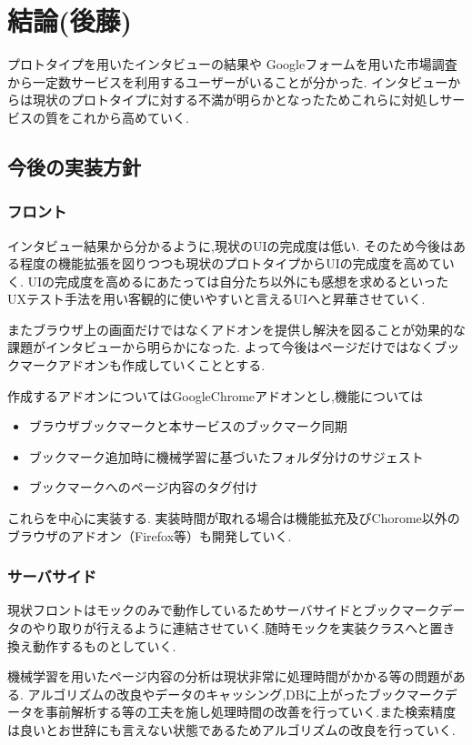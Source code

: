 \documentclass[a4paper,10pt,fleqn]{jsarticle}
\begin{document}
\section{結論(後藤)}
プロトタイプを用いたインタビューの結果や
Googleフォームを用いた市場調査から一定数サービスを利用するユーザーがいることが分かった.
インタビューからは現状のプロトタイプに対する不満が明らかとなったためこれらに対処しサービスの質をこれから高めていく.

\subsection{今後の実装方針}
\subsubsection{フロント}
インタビュー結果から分かるように,現状のUIの完成度は低い.
そのため今後はある程度の機能拡張を図りつつも現状のプロトタイプからUIの完成度を高めていく. UIの完成度を高めるにあたっては自分たち以外にも感想を求めるといったUXテスト手法を用い客観的に使いやすいと言えるUIへと昇華させていく.
\par またブラウザ上の画面だけではなくアドオンを提供し解決を図ることが効果的な課題がインタビューから明らかになった. よって今後はページだけではなくブックマークアドオンも作成していくこととする.
\par 作成するアドオンについてはGoogleChromeアドオンとし,機能については
\begin{itemize}
  \item ブラウザブックマークと本サービスのブックマーク同期
  \item ブックマーク追加時に機械学習に基づいたフォルダ分けのサジェスト
  \item ブックマークへのページ内容のタグ付け
\end{itemize}
これらを中心に実装する. 実装時間が取れる場合は機能拡充及びChorome以外のブラウザのアドオン（Firefox等）も開発していく.

\subsubsection{サーバサイド}
現状フロントはモックのみで動作しているためサーバサイドとブックマークデータのやり取りが行えるように連結させていく.随時モックを実装クラスへと置き換え動作するものとしていく.
\par 機械学習を用いたページ内容の分析は現状非常に処理時間がかかる等の問題がある. アルゴリズムの改良やデータのキャッシング,DBに上がったブックマークデータを事前解析する等の工夫を施し処理時間の改善を行っていく.また検索精度は良いとお世辞にも言えない状態であるためアルゴリズムの改良を行っていく.
\end{document}
